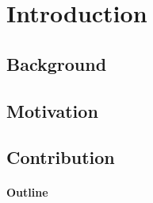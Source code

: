 \documentclass{article}                 %
\begin{document}
\maketitle

\begin{flushright}
  \begin{minipage}{2.5in}
    \normalsize \rmfamily\scshape\bfseries
    \color{red}{%
      Thou Mortal, Be Warned. \newline
      Thou Shallt Not Remove \newline
      This Commandment \newline
      While There Are Signs of Haste \newline
      in This Document!!!!\newline
    }
  \end{minipage}
\end{flushright}

\begin{abstract}
  \lipsum
\end{abstract}

\section{Introduction}
\subsection{Background}
\lipsum

\subsection{Motivation}
\lipsum

\subsection{Contribution}
\lipsum

\paragraph{Outline} \lipsum
\end{document}
